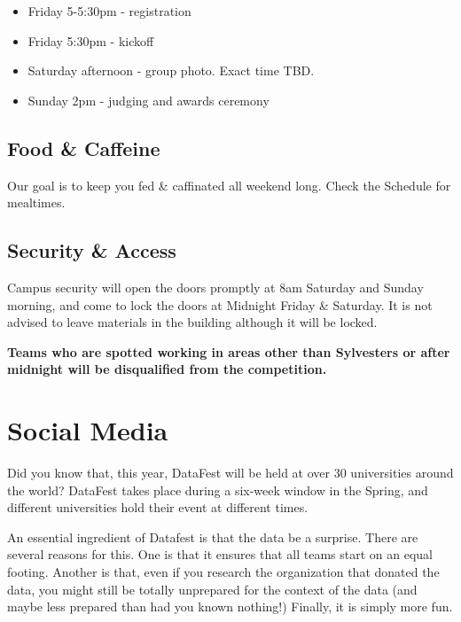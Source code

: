 \documentclass[]{article}
\providecommand{\tightlist}{%
  \setlength{\itemsep}{0pt}\setlength{\parskip}{0pt}}
\begin{document}
\begin{itemize}
\tightlist
\item
  Friday 5-5:30pm - registration
\item
  Friday 5:30pm - kickoff
\item
  Saturday afternoon - group photo. Exact time TBD.
\item
  Sunday 2pm - judging and awards ceremony
\end{itemize}

\hypertarget{food-caffeine}{%
\subsection{Food \& Caffeine}\label{food-caffeine}}

Our goal is to keep you fed \& caffinated all weekend long. Check the
Schedule for mealtimes.

\hypertarget{security-access}{%
\subsection{Security \& Access}\label{security-access}}

Campus security will open the doors promptly at 8am Saturday and Sunday
morning, and come to lock the doors at Midnight Friday \& Saturday. It
is not advised to leave materials in the building although it will be
locked.

\textbf{Teams who are spotted working in areas other than Sylvesters or
after midnight will be disqualified from the competition.}

\hypertarget{social-media}{%
\section{Social Media}\label{social-media}}

Did you know that, this year, DataFest will be held at over 30
universities around the world? DataFest takes place during a six-week
window in the Spring, and different universities hold their event at
different times.

An essential ingredient of Datafest is that the data be a surprise.
There are several reasons for this. One is that it ensures that all
teams start on an equal footing. Another is that, even if you research
the organization that donated the data, you might still be totally
unprepared for the context of the data (and maybe less prepared than had
you known nothing!) Finally, it is simply more fun.
\end{document}
